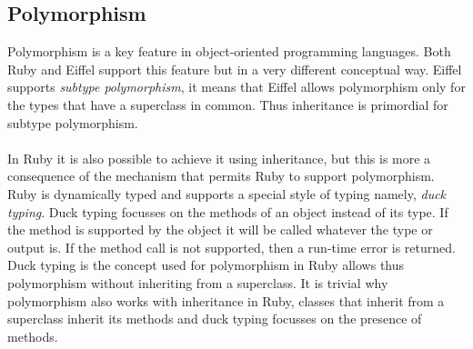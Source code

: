 \documentclass[12pt,a4paper,twocolumn]{article}
\begin{document}
\subsection{Polymorphism} 
Polymorphism is a key feature in object-oriented programming languages. Both Ruby and Eiffel support this feature but in a very different conceptual way. Eiffel supports \emph{subtype polymorphism}, it means that Eiffel allows polymorphism only for the types that have a superclass in common. Thus inheritance is primordial for subtype polymorphism. 
\\
\\ 
In Ruby it is also possible to achieve it using inheritance, but this is more a consequence of the mechanism that permits Ruby to support polymorphism. Ruby is dynamically typed and supports a special style of typing namely, \emph{duck typing}\cite{wiki:duck}. Duck typing focusses on the methods of an object instead of its type. If the method is supported by the object it will be called whatever the type or output is. If the method call is not supported, then a run-time error is returned. Duck typing is the concept used for polymorphism in Ruby allows thus polymorphism without inheriting from a superclass. It is trivial why polymorphism also works with inheritance in Ruby, classes that inherit from a superclass inherit its methods and duck typing focusses on the presence of methods.
\\
\\
\end{document}
